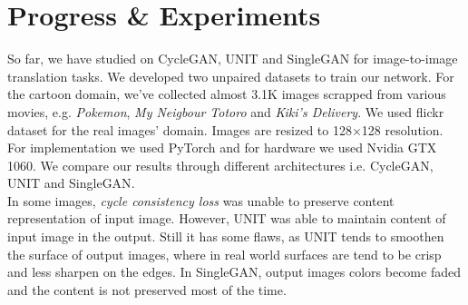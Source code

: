 \chapter{Progress \& Experiments} \label{chap:prog}
So far, we have studied on CycleGAN\cite{cyclegan}, UNIT\cite{DBLP:journals/corr/LiuBK17} and SingleGAN\cite{SingleGAN} for image-to-image translation tasks. We developed two unpaired datasets to train our network. For the cartoon domain, we've collected almost 3.1K images scrapped from various movies, e.g. \textit{Pokemon}, \textit{My Neigbour Totoro} and \textit{Kiki’s Delivery}. We used flickr dataset for the real images’ domain. Images are resized to 128×128 resolution. For implementation we used PyTorch and for hardware we used Nvidia GTX 1060. We compare our results through different architectures i.e. CycleGAN\cite{cyclegan}, UNIT\cite{DBLP:journals/corr/LiuBK17} and SingleGAN\cite{SingleGAN}.\\
In some images, \textit{cycle consistency loss} was unable to preserve content representation of input image. However, UNIT\cite{DBLP:journals/corr/LiuBK17} was able to maintain content of input image in the output. Still it has some flaws, as UNIT tends to smoothen the surface of output images, where in real world surfaces are tend to be crisp and less sharpen on the edges. In SingleGAN\cite{SingleGAN}, output images colors become faded and the content is not preserved most of the time.

